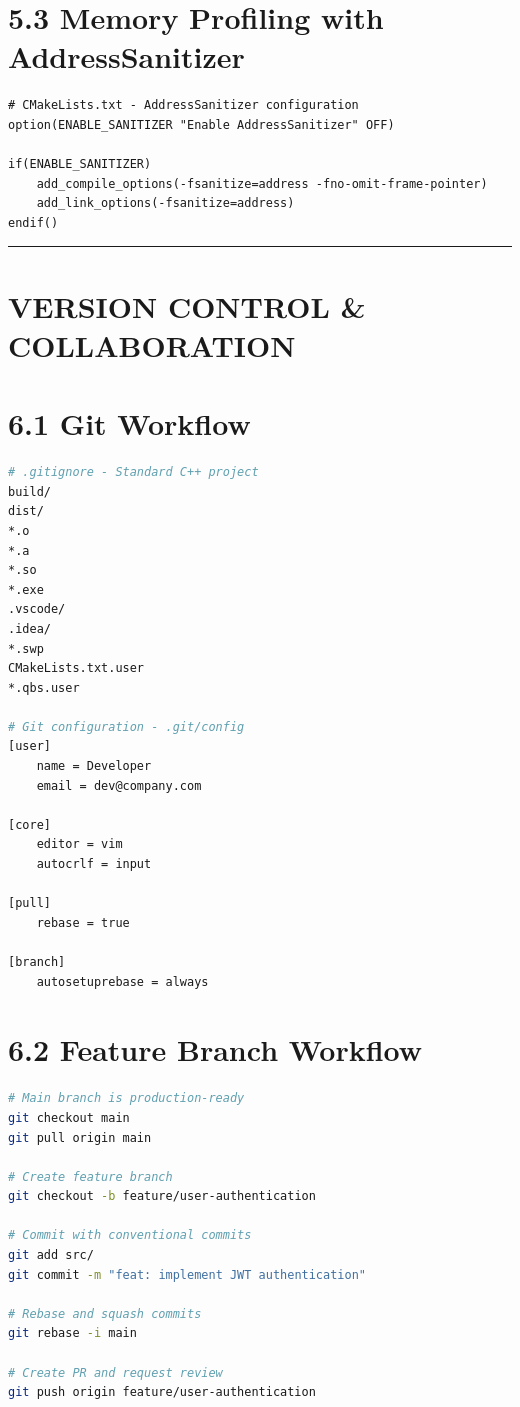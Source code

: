 \hypertarget{memory-profiling-with-addresssanitizer}{%
\section{5.3 Memory Profiling with
AddressSanitizer}\label{memory-profiling-with-addresssanitizer}}

\begin{lstlisting}
# CMakeLists.txt - AddressSanitizer configuration
option(ENABLE_SANITIZER "Enable AddressSanitizer" OFF)

if(ENABLE_SANITIZER)
    add_compile_options(-fsanitize=address -fno-omit-frame-pointer)
    add_link_options(-fsanitize=address)
endif()
\end{lstlisting}

\begin{center}\rule{0.5\linewidth}{0.5pt}\end{center}

\hypertarget{version-control-collaboration}{%
\section{VERSION CONTROL \&
COLLABORATION}\label{version-control-collaboration}}

\hypertarget{git-workflow}{%
\section{6.1 Git Workflow}\label{git-workflow}}

\begin{lstlisting}[language=bash]
# .gitignore - Standard C++ project
build/
dist/
*.o
*.a
*.so
*.exe
.vscode/
.idea/
*.swp
CMakeLists.txt.user
*.qbs.user

# Git configuration - .git/config
[user]
    name = Developer
    email = dev@company.com

[core]
    editor = vim
    autocrlf = input

[pull]
    rebase = true

[branch]
    autosetuprebase = always
\end{lstlisting}

\hypertarget{feature-branch-workflow}{%
\section{6.2 Feature Branch Workflow}\label{feature-branch-workflow}}

\begin{lstlisting}[language=bash]
# Main branch is production-ready
git checkout main
git pull origin main

# Create feature branch
git checkout -b feature/user-authentication

# Commit with conventional commits
git add src/
git commit -m "feat: implement JWT authentication"

# Rebase and squash commits
git rebase -i main

# Create PR and request review
git push origin feature/user-authentication
\end{lstlisting}

